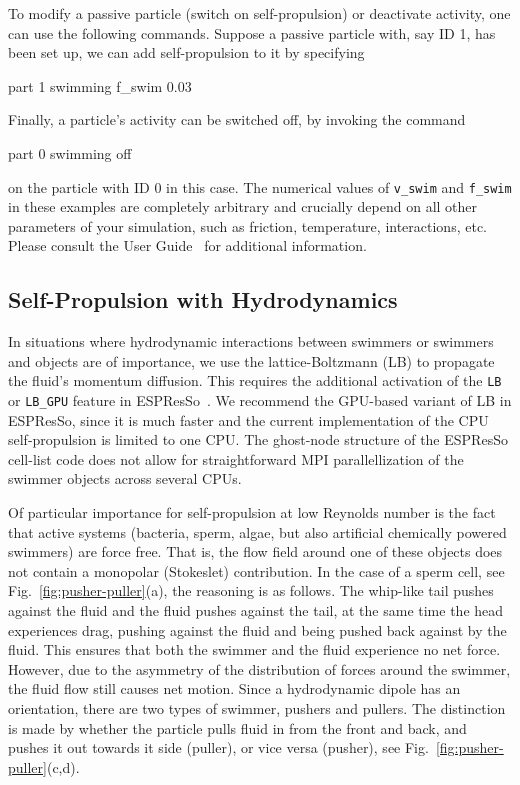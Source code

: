 \documentclass[aip,jcp,reprint,a4paper,onecolumn,amsmath]{revtex4-1}
\newcommand\code{\lstinline}
\newcommand{\es}{\mbox{\textsf{ESPResSo}}\xspace}
\newcommand\codees{\lstinline[language=espresso]}
\begin{document}
To modify a passive particle (switch on self-propulsion) or deactivate activity, one can use the following commands. Suppose a passive particle with, say ID 1, has been set up, we can add self-propulsion to it by specifying
\begin{espresso}
part 1 swimming f_swim 0.03
\end{espresso}
Finally, a particle's activity can be switched off, by invoking the command 
\begin{espresso}
part 0 swimming off
\end{espresso}
on the particle with ID 0 in this case. The numerical values of \codees{v_swim} and \codees{f_swim} in these examples are completely arbitrary and crucially depend on all other parameters of your simulation, such as friction, temperature, interactions, etc. Please consult the User Guide~\cite{UG} for additional information.

\subsection{\label{sub:lattice}Self-Propulsion with Hydrodynamics}

In situations where hydrodynamic interactions between swimmers or swimmers and objects are of importance, we use the lattice-Boltzmann (LB) to propagate the fluid's momentum diffusion. This requires the additional activation of the \code{LB} or \code{LB_GPU} feature in \es{}~\cite{UG,Arnold_13,roehm12}. We recommend the GPU-based variant of LB in \es{}, since it is much faster and the current implementation of the CPU self-propulsion is limited to one CPU. The ghost-node structure of the \es{} cell-list code does not allow for straightforward MPI parallellization of the swimmer objects across several CPUs. 

Of particular importance for self-propulsion at low Reynolds number is the fact that active systems (bacteria, sperm, algae, but also artificial chemically powered swimmers) are force free. That is, the flow field around one of these objects does not contain a monopolar (Stokeslet) contribution. In the case of a sperm cell, see Fig.~\ref{fig:pusher-puller}(a), the reasoning is as follows. The whip-like tail pushes against the fluid and the fluid pushes against the tail, at the same time the head experiences drag, pushing against the fluid and being pushed back against by the fluid. This ensures that both the swimmer and the fluid experience no net force. However, due to the asymmetry of the distribution of forces around the swimmer, the fluid flow still causes net motion. Since a hydrodynamic dipole has an orientation, there are two types of swimmer, pushers and pullers. The distinction is made by whether the particle pulls fluid in from the front and back, and pushes it out towards it side (puller), or vice versa (pusher), see Fig.~\ref{fig:pusher-puller}(c,d).
\end{document}
